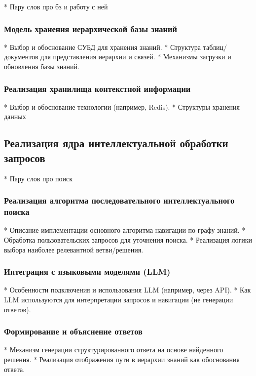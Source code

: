 *   Пару слов про бз и работу с ней

\subsubsection{Модель хранения иерархической базы знаний}

*   Выбор и обоснование СУБД для хранения знаний.
*   Структура таблиц/документов для представления иерархии и связей.
*   Механизмы загрузки и обновления базы знаний.

\subsubsection{Реализация хранилища контекстной информации}

*   Выбор и обоснование технологии (например, Redis).
*   Структуры хранения данных

\subsection{Реализация ядра интеллектуальной обработки запросов}

*   Пару слов про поиск

\subsubsection{Реализация алгоритма последовательного интеллектуального поиска}

*   Описание имплементации основного алгоритма навигации по графу знаний.
*   Обработка пользовательских запросов для уточнения поиска.
*   Реализация логики выбора наиболее релевантной ветви/решения.

\subsubsection{Интеграция с языковыми моделями (LLM)}

*   Особенности подключения и использования LLM (например, через API).
*   Как LLM используются для интерпретации запросов и навигации (не генерации ответов).

\subsubsection{Формирование и объяснение ответов}

*   Механизм генерации структурированного ответа на основе найденного решения.
*   Реализация отображения пути в иерархии знаний как обоснования ответа.

